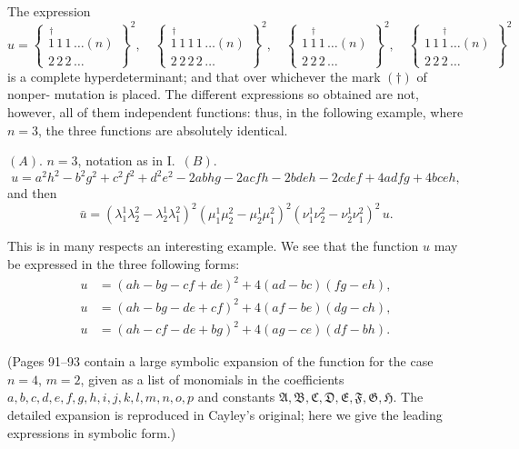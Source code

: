 \documentclass[11pt,a4paper]{article}
\theoremstyle{plain}
\theoremstyle{definition}
\theoremstyle{remark}
\begin{document}
The expression
\[
u =
\left\{
\begin{array}{c}
\stackrel{\dagger}{1}\,1\,1\,\ldots(n) \\[2pt]
\hline
2\,2\,2\,\ldots
\end{array}
\right\}^2,
\quad
\left\{
\begin{array}{c}
\stackrel{\dagger}{1}\,1\,1\,1\,\ldots(n) \\[2pt]
\hline
2\,2\,2\,2\,\ldots
\end{array}
\right\}^2,
\quad
\left\{
\begin{array}{c}
1\,\stackrel{\dagger}{1}\,1\,\ldots(n) \\[2pt]
\hline
2\,2\,2\,\ldots
\end{array}
\right\}^2,
\quad
\left\{
\begin{array}{c}
1\,1\,\stackrel{\dagger}{1}\,\ldots(n) \\[2pt]
\hline
2\,2\,2\,\ldots
\end{array}
\right\}^2
\]
is a complete hyperdeterminant; and that over whichever the mark $(\dagger)$ of nonper-
mutation is placed. The different expressions so obtained are not, however, all of them
independent functions: thus, in the following example, where $n=3$, the three functions
are absolutely identical.

$(A)$. $n=3$, notation as in I.\ $(B)$.
\[
u = a^2h^2 - b^2g^2 + c^2f^2 + d^2e^2 - 2abhg - 2acfh - 2bdeh - 2cdef + 4adfg + 4bceh,
\]
and then
\[
\bar{u} = (\lambda_1^1\lambda_2^2 - \lambda_2^1\lambda_1^2)^2(\mu_1^1\mu_2^2 - \mu_2^1\mu_1^2)^2(\nu_1^1\nu_2^2 - \nu_2^1\nu_1^2)^2\,u.
\]

This is in many respects an interesting example. We see that the function $u$
may be expressed in the three following forms:
\begin{align*}
u &= (ah - bg - cf + de)^2 + 4(ad - bc)(fg - eh), \tag{1}\\
u &= (ah - bg - de + cf)^2 + 4(af - be)(dg - ch), \tag{2}\\
u &= (ah - cf - de + bg)^2 + 4(ag - ce)(df - bh). \tag{3}
\end{align*}

\newpage

(Pages 91--93 contain a large symbolic expansion of the function for the case
$n=4$, $m=2$, given as a list of monomials in the coefficients $a,b,c,d,e,f,g,h,i,j,k,l,m,n,o,p$
and constants $\mathfrak{A,B,C,D,E,F,G,H}$. The detailed expansion is reproduced in
Cayley's original; here we give the leading expressions in symbolic form.)
\end{document}

